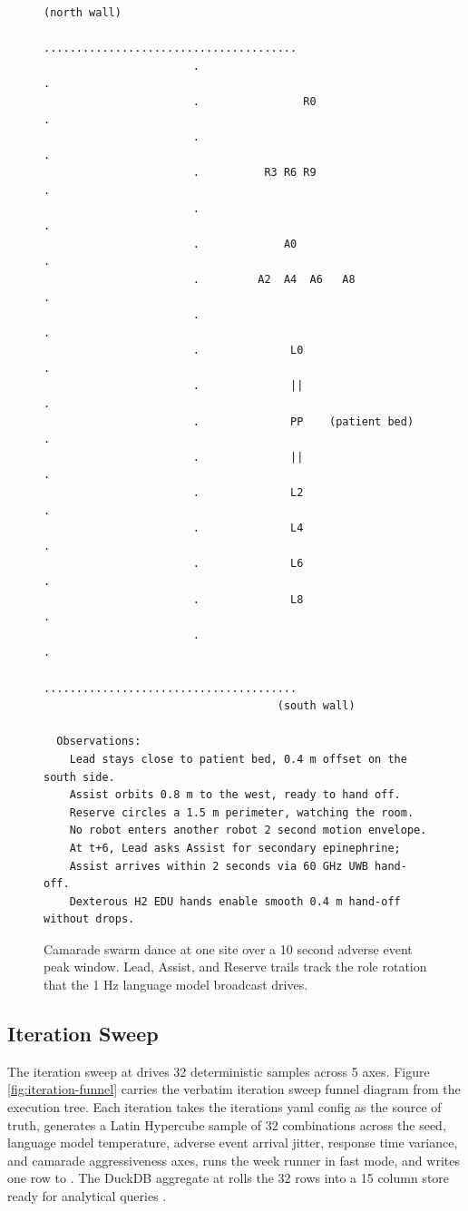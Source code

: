 \begin{sectionaccent}
\begin{figure}[H]
\begin{Verbatim}[fontsize=\small]
                                     (north wall)
                       .......................................
                       .                                     .
                       .                R0                   .
                       .                                     .
                       .          R3 R6 R9                   .
                       .                                     .
                       .             A0                      .
                       .         A2  A4  A6   A8             .
                       .                                     .
                       .              L0                     .
                       .              ||                     .
                       .              PP    (patient bed)    .
                       .              ||                     .
                       .              L2                     .
                       .              L4                     .
                       .              L6                     .
                       .              L8                     .
                       .                                     .
                       .......................................
                                    (south wall)

  Observations:
    Lead stays close to patient bed, 0.4 m offset on the south side.
    Assist orbits 0.8 m to the west, ready to hand off.
    Reserve circles a 1.5 m perimeter, watching the room.
    No robot enters another robot 2 second motion envelope.
    At t+6, Lead asks Assist for secondary epinephrine;
    Assist arrives within 2 seconds via 60 GHz UWB hand-off.
    Dexterous H2 EDU hands enable smooth 0.4 m hand-off without drops.
\end{Verbatim}
\caption{Camarade swarm dance at one site over a 10 second adverse event peak window. Lead, Assist, and Reserve trails track the role rotation that the 1 Hz language model broadcast drives.}
\label{fig:swarm-dance}
\end{figure}

\subsection{Iteration Sweep}
\label{sec:methods-iterations}

The iteration sweep at  drives 32
deterministic samples across 5 axes. Figure
\ref{fig:iteration-funnel} carries the verbatim iteration sweep
funnel diagram from the execution tree. Each iteration takes the
iterations yaml config as the source of truth, generates a Latin
Hypercube sample of 32 combinations across the seed, language model
temperature, adverse event arrival jitter, response time variance,
and camarade aggressiveness axes, runs the week runner in fast mode,
and writes one row to .
The DuckDB aggregate at
 rolls the 32
rows into a 15 column store ready for analytical queries
\cite{duckdb_2026, apache_arrow_2026}.


\end{sectionaccent}

